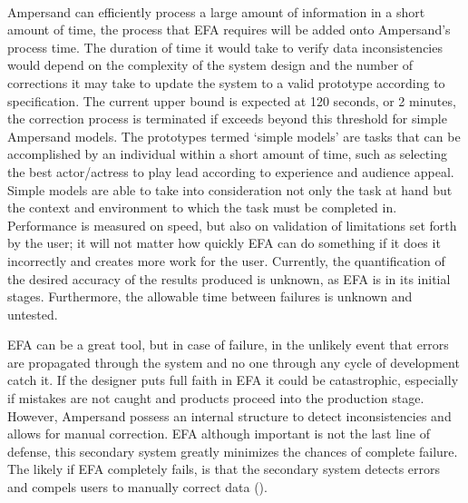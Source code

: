 \documentclass[12pt]{report}
\begin{document}
\paragraph*{}
Ampersand can efficiently process a large amount of information in a short amount of time, the 
process that EFA requires will be added onto Ampersand’s process time. The duration of time it 
would take to verify data inconsistencies would depend on the complexity of the system design and 
the number of corrections it may take to update the system to a valid prototype according to 
specification. The current upper bound is expected at 120 seconds, or 2 minutes, the correction 
process is terminated if exceeds beyond this threshold for simple Ampersand models. The prototypes 
termed ‘simple models’ are tasks that can be accomplished by an individual within a short amount of 
time, such as selecting the best actor/actress to play lead according to experience and audience 
appeal. Simple models are able to take into consideration not only the task at hand but the context 
and environment to which the task must be completed in. Performance is measured on speed, but also 
on validation of limitations set forth by the user; it will not matter how quickly EFA can do 
something if it does it incorrectly and creates more work for the user. Currently, the 
quantification of the desired accuracy of the results produced is unknown, as EFA is in its 
initial stages. Furthermore, the allowable time between failures is unknown and untested.

EFA can be a great tool, but in case of failure, in the unlikely event that errors are 
propagated through the system and no one through any cycle of development catch it. If the designer 
puts full faith in EFA it could be catastrophic, especially if mistakes are not caught and 
products proceed into the production stage. However, Ampersand possess an internal structure to 
detect inconsistencies and allows for manual correction. EFA although important is not the last 
line of defense, this secondary system greatly minimizes the chances of complete failure. The 
likely if EFA completely fails, is that the secondary system detects errors and compels users to 
manually correct data (\cite[153]{RBD}). 
\end{document}
